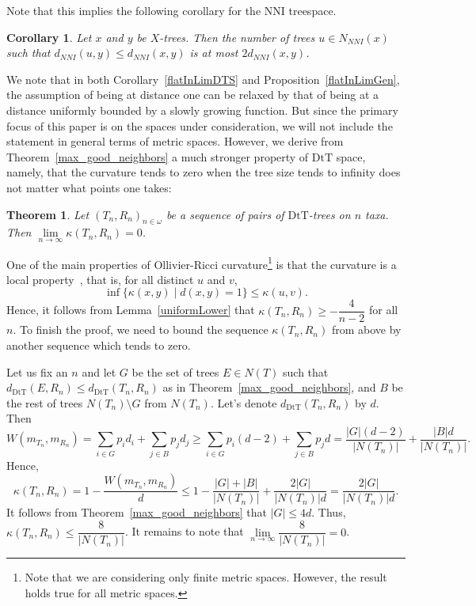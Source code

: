 \documentclass{amsart}
\newtheorem{corollary}[lemma]{Corollary}
\newtheorem{theorem}[lemma]{Theorem}
\newcommand{\dts}{\mathrm{DtT}}
\newcommand{\nni}{\mathrm{NNI}}
\begin{document}
Note that this implies the following corollary for the $\nni$ treespace.
\begin{corollary}
Let $x$ and $y$ be $X$-trees.
Then the number of trees $u \in N_{NNI}(x)$ such that $d_{NNI}(u, y) \le d_{NNI}(x, y)$ is at most $2d_{NNI}(x,y)$.
\end{corollary}

We note that in both Corollary~\ref{flatInLimDTS} and Proposition~\ref{flatInLimGen}, the assumption of being at distance one can be relaxed by that of being at a distance uniformly bounded by a slowly growing function.
But since the primary focus of this paper is on the spaces under consideration, we will not  include the statement in general terms of metric spaces. 
However, we derive from Theorem~\ref{max_good_neighbors} a much stronger property of $\dts$ space, namely, that the curvature tends to zero when the tree size tends to infinity does not matter what points one takes:

\begin{theorem}
Let $(T_n,R_n)_{n\in\omega}$ be a sequence of pairs of $\dts$-trees on $n$ taxa.
Then $\lim\limits_{n \to \infty}\kappa(T_n,R_n) = 0$.
\end{theorem}

\proof
One of the main properties of Ollivier-Ricci curvature\footnote{Note that we are considering only finite metric spaces. 
However, the result holds true for all metric spaces.} 
is that the curvature is a local property~\cite{Ollivier2009-cj}, that is, for all distinct $u$ and $v$,
\[
\inf\{\kappa(x,y)\mid d(x,y) = 1\} \leq \kappa(u,v).
\]
Hence, it follows from Lemma~\ref{uniformLower} that $\kappa(T_n,R_n) \geq -\dfrac{4}{n-2}$ for all $n$. 
To finish the proof, we need to bound the sequence $\kappa(T_n,R_n)$ from above by another sequence which tends to zero. 

Let us fix an $n$ and let $G$ be the set of trees $E \in N(T)$ such that $d_\dts(E,R_n) \leq d_\dts(T_n,R_n)$ as in Theorem~\ref{max_good_neighbors}, and $B$ be the rest of trees $N(T_n)\setminus G$ from $N(T_n)$. 
Let's denote $d_\dts(T_n,R_n)$ by $d$. Then 
\[
W(m_{T_n},m_{R_n}) = \sum_{i\in G} p_i d_i + \sum_{j\in B} p_j d_j \geq
\sum_{i\in G} p_i (d-2) + \sum_{j\in B} p_j d = 
\frac{|G|(d-2)}{|N(T_n)|} + \frac{|B|d}{|N(T_n)|}.
\]
Hence,
\[
\kappa(T_n,R_n) = 1 - \frac{W(m_{T_n},m_{R_n})}{d} \leq
1 - \frac{|G| + |B|}{|N(T_n)|} + \frac{2|G|}{|N(T_n)|d} 
= \frac{2|G|}{|N(T_n)|d}.
\]
It follows from Theorem~\ref{max_good_neighbors} that $|G| \leq 4d$. 
Thus, $\kappa(T_n,R_n) \leq \dfrac{8}{|N(T_n)|}$. 
It remains to note that $\lim\limits_{n\to\infty}\dfrac{8}{|N(T_n)|} = 0$. 
\endproof
\end{document}

